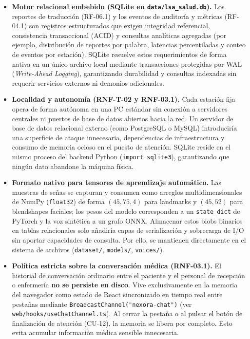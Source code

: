 \begin{itemize}
    \item \textbf{Motor relacional embebido (SQLite en \texttt{data/lsa\_salud.db}).}
    Los reportes de traducción (RF-06.1) y los eventos de auditoría y métricas
    (RF-04.1) son registros estructurados que exigen integridad referencial,
    consistencia transaccional (ACID) y consultas analíticas agregadas (por
    ejemplo, distribución de reportes por palabra, latencias percentiladas y
    conteo de eventos por estación). SQLite resuelve estos requerimientos de
    forma nativa en un único archivo local mediante transacciones protegidas
    por WAL (\textit{Write-Ahead Logging}), garantizando durabilidad y
    consultas indexadas sin requerir servicios externos ni demonios
    adicionales.

    \item \textbf{Localidad y autonomía (RNF-T-02 y RNF-03.1).} Cada estación
    fija opera de forma autónoma en una PC estándar sin conexión a servidores
    centrales ni puertos de base de datos abiertos hacia la red. Un servidor de
    base de datos relacional externo (como PostgreSQL o MySQL) introduciría una
    superficie de ataque innecesaria, dependencias de infraestructura y
    consumo de memoria ocioso en el puesto de atención. SQLite reside en el
    mismo proceso del backend Python (\texttt{import sqlite3}), garantizando
    que ningún dato abandone la máquina física.

    \item \textbf{Formato nativo para tensores de aprendizaje automático.} Las
    muestras de señas se capturan y consumen como arreglos multidimensionales
    de NumPy (\texttt{float32}) de forma $(45, 75, 4)$ para landmarks y
    $(45, 52)$ para blendshapes faciales; los pesos del modelo corresponden a un
    \texttt{state\_dict} de PyTorch y la voz sintética a un grafo ONNX.
    Almacenar estos blobs binarios en tablas relacionales solo añadiría capas
    de serialización y sobrecarga de I/O sin aportar capacidades de consulta.
    Por ello, se mantienen directamente en el sistema de archivos
    (\texttt{dataset/}, \texttt{models/}, \texttt{voices/}).

    \item \textbf{Política estricta sobre la conversación médica (RNF-03.1).}
    El historial de conversación ordinario entre el paciente y el personal de
    recepción o enfermería \textbf{no se persiste en disco}. Vive
    exclusivamente en la memoria del navegador como estado de React sincronizado
    en tiempo real entre pestañas mediante \texttt{BroadcastChannel("nexora-chat")}
    (ver \texttt{web/hooks/useChatChannel.ts}). Al cerrar la pestaña o al pulsar
    el botón de finalización de atención (CU-12), la memoria se libera por
    completo. Esto evita acumular información médica sensible innecesaria.
\end{itemize}

